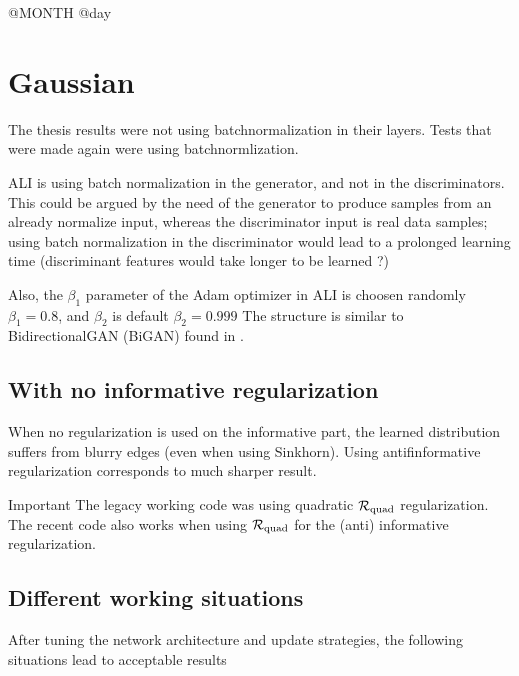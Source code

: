 \documentclass[11pt,a4paper]{article}
\begin{document}

{\Huge @MONTH @day}

\section*{Gaussian}

The thesis results were not using batchnormalization in their layers. Tests that were made again were using batchnormlization.

ALI is using batch normalization in the generator, and not in the discriminators. This could be argued by the need of the generator to produce samples from an already normalize input, whereas the discriminator input is real data samples; using batch normalization in the discriminator would lead to a prolonged learning time (discriminant features would take longer to be learned ?)

Also, the $\beta_1$ parameter of the Adam optimizer in ALI is choosen randomly $\beta_1 = 0.8$, and $\beta_2$ is default $\beta_2 = 0.999$
The structure is similar to BidirectionalGAN (BiGAN) found in \cite{Donahue2016}.

\subsection{With no informative regularization}

When no regularization is used on the informative part, the learned
distribution suffers from blurry edges (even when using Sinkhorn). Using
antifinformative regularization corresponds to much sharper result.



{\Large Important}
The legacy working code was using quadratic $\mathcal{R}_{\mathrm{quad}}$ regularization. The recent code also works when using $\mathcal{R}_{\mathrm{quad}}$ for the (anti) informative regularization.

\subsection{Different working situations}

After tuning the network architecture and update strategies, the following situations lead to acceptable results
\end{document}
